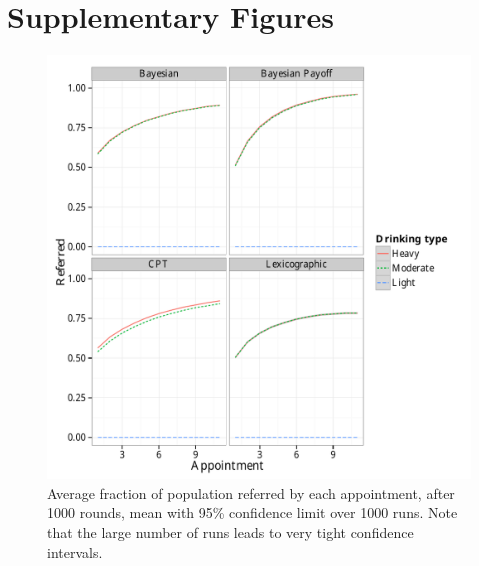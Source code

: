 
\section{Supplementary Figures}
\label{app:additional_figures}

\begin{figure}[h]
\includegraphics[width=119mm]{figures/ref_plot}
\caption{Average fraction of population referred by each appointment, after 1000 rounds, mean with 95\% confidence limit over 1000 runs. Note that the large number of runs leads to very tight confidence intervals.\label{fig:ref_plot}}
\end{figure}